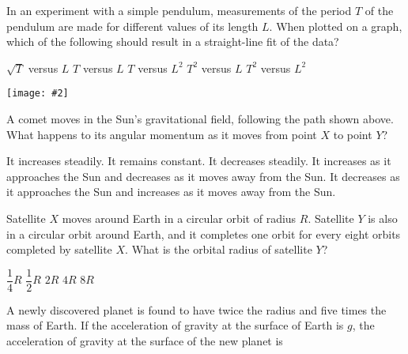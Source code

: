 \documentclass[12pt]{exam}
\newcommand{\pic}[2]{\texttt{[image: \#2]}}
\begin{document}
\begin{questions}
  \question In an experiment with a simple pendulum, measurements of the period
  $T$ of the pendulum are made for different values of its length $L$.
  When plotted on a graph, which of the following should result in a
  straight-line fit of the data?

  \begin{oneparchoices}
    \choice $\sqrt{T}$ versus $L$
    \choice $T$ versus $L$
    \choice $T$ versus $L^2$
    \choice $T^2$ versus $L$
    \choice $T^2$ versus $L^2$
  \end{oneparchoices}
  \vspace{.7in}

  \begin{center}
    \pic{.18}{comet}
  \end{center}
  \question A comet moves in the Sun's gravitational field, following the path
  shown above. What happens to its angular momentum as it moves from point $X$
  to point $Y$?
  \begin{choices}
    \choice It increases steadily.
    \choice It remains constant.
    \choice It decreases steadily.
    \choice It increases as it approaches the Sun and decreases as it moves
    away from the Sun.
    \choice It decreases as it approaches the Sun and increases as it moves
    away from the Sun.
  \end{choices}
  \vspace{.7in}

  \question Satellite $X$ moves around Earth in a circular orbit of radius $R$.
  Satellite $Y$ is also in a circular orbit around Earth, and it completes one
  orbit for every eight orbits completed by satellite $X$. What is the
  orbital radius of satellite $Y$?

  \begin{oneparchoices}
    \choice $\dfrac14R$\hspace{.2in}
    \choice $\dfrac12R$\hspace{.2in}
    \choice $2R$\hspace{.2in}
    \choice $4R$\hspace{.2in}
    \choice $8R$
  \end{oneparchoices}
  \vspace{.2in}

\item A newly discovered planet is found to have twice the radius and five
  times the mass of Earth. If the acceleration of gravity at the surface of
  Earth is $g$, the acceleration of gravity at the surface of the new planet is


\end{questions}
\end{document}
